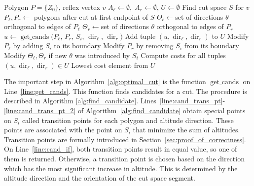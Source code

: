 \documentclass[../main.tex]{subfiles}
\begin{document}
\begin{algorithm}
	\caption{$\operatorname{find\_optimal\_cut}(P, v)$}
	\label{alg:optimal_cut}
	\begin{algorithmic}[1]
		\REQUIRE Polygon $P=\{Z_0\}$, reflex vertex $v$
			\STATE $A_{\ell}\gets\emptyset,\;A_r\gets\emptyset$, $U\gets\emptyset$
			\STATE Find cut space $S$ for $v$	\label{line:cut_cut_space}
			\STATE $P_{\ell},P_r\gets$ polygons after cut at first endpoint of $S$ \label{line:cut_two_polygons}
			\STATE $\Theta_{\ell}\gets$set of directions $\theta$ orthogonal to edges of $P_{\ell}$ \label{line:cut_two_sets}
			\STATE $\Theta_r\gets$set of directions $\theta$ orthogonal to edges of $P_r$ \label{line:cut_two_sets_2}
			 \label{line:opt_cut_for}
						\STATE $u\gets\operatorname{get\_cands}(P_{\ell}$, $P_r$, $S_i$, $\operatorname{dir}_{\ell}$, $\operatorname{dir}_r)$ \label{line:get_cands}
						\STATE Add tuple $(u, \operatorname{dir}_{\ell}, \operatorname{dir}_r)$ to $U$
					\ENDFOR
				\ENDFOR
				\STATE Modify $P_{\ell}$ by adding $S_i$ to its boundary \label{line:cut_modify_1}
				\STATE Modify $P_r$ by removing $S_i$ from its boundary
				\STATE Modify $\Theta_{\ell},\Theta_r$ if new $\theta$ was introduced by $S_i$ \label{line:opt_cut_end_for}
			\ENDFOR 
			\STATE Compute costs for all tuples $(u, \operatorname{dir}_{\ell}, \operatorname{dir}_r)\in U$
			\RETURN Lowest cost element from $U$
	\end{algorithmic}
\end{algorithm}
The important step in Algorithm~\ref{alg:optimal_cut} is the function $\operatorname{get\_cands}$ on Line~\ref{line:get_cands}. This function finds candidates for a cut. The procedure is described in Algorithm \ref{alg:find_candidate}.
Lines~\ref{line:cand_trans_pt}-\ref{line:cand_trans_pt_2} of Algorithm~\ref{alg:find_candidate} obtain special points on $S_i$ called transition points for each polygon and altitude direction. These points are associated with the point on $S_i$ that minimize the sum of altitudes. Transition points are formally introduced in Section~\ref{sec:proof_of_correctness}. On Line~\ref{line:cand_if}, both transition points result in equal value, so one of them is returned. Otherwise, a transition point is chosen based on the direction which has the most significant increase in altitude. This is determined by the altitude direction and the orientation of the cut space segment.
\end{document}
